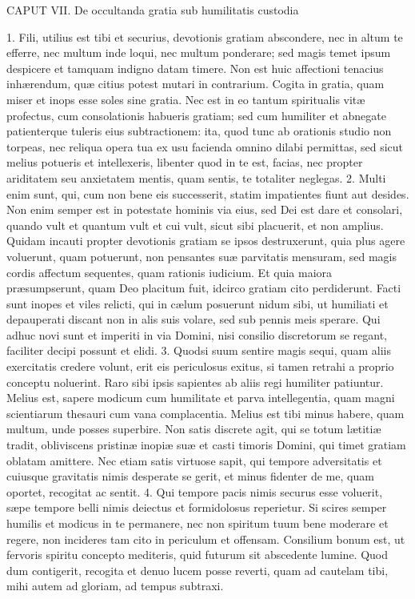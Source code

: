 CAPUT VII.
De occultanda gratia sub humilitatis custodia

1. Fili, utilius est tibi et securius, devotionis gratiam abscondere, nec in altum te efferre, nec multum inde loqui, nec multum ponderare; sed magis temet ipsum despicere et tamquam indigno datam timere. Non est huic affectioni tenacius inhærendum, quæ citius potest mutari in contrarium. Cogita in gratia, quam miser et inops esse soles sine gratia. Nec est in eo tantum spiritualis vitæ profectus, cum consolationis habueris gratiam; sed cum humiliter et abnegate patienterque tuleris eius subtractionem: ita, quod tunc ab orationis studio non torpeas, nec reliqua opera tua ex usu facienda omnino dilabi permittas, sed sicut melius potueris et intellexeris, libenter quod in te est, facias, nec propter ariditatem seu anxietatem mentis, quam sentis, te totaliter neglegas.
2. Multi enim sunt, qui, cum non bene eis successerit, statim impatientes fiunt aut desides. Non enim semper est in potestate hominis via eius, sed Dei est dare et consolari, quando vult et quantum vult et cui vult, sicut sibi placuerit, et non amplius. Quidam incauti propter devotionis gratiam se ipsos destruxerunt, quia plus agere voluerunt, quam potuerunt, non pensantes suæ parvitatis mensuram, sed magis cordis affectum sequentes, quam rationis iudicium. Et quia maiora præsumpserunt, quam Deo placitum fuit, idcirco gratiam cito perdiderunt. Facti sunt inopes et viles relicti, qui in cælum posuerunt nidum sibi, ut humiliati et depauperati discant non in alis suis volare, sed sub pennis meis sperare. Qui adhuc novi sunt et imperiti in via Domini, nisi consilio discretorum se regant, faciliter decipi possunt et elidi.
3. Quodsi suum sentire magis sequi, quam aliis exercitatis credere volunt, erit eis periculosus exitus, si tamen retrahi a proprio conceptu noluerint. Raro sibi ipsis sapientes ab aliis regi humiliter patiuntur. Melius est, sapere modicum cum humilitate et parva intellegentia, quam magni scientiarum thesauri cum vana complacentia. Melius est tibi minus habere, quam multum, unde posses superbire. Non satis discrete agit, qui se totum lætitiæ tradit, obliviscens pristinæ inopiæ suæ et casti timoris Domini, qui timet gratiam oblatam amittere. Nec etiam satis virtuose sapit, qui tempore adversitatis et cuiusque gravitatis nimis desperate se gerit, et minus fidenter de me, quam oportet, recogitat ac sentit.
4. Qui tempore pacis nimis securus esse voluerit, sæpe tempore belli nimis deiectus et formidolosus reperietur. Si scires semper humilis et modicus in te permanere, nec non spiritum tuum bene moderare et regere, non incideres tam cito in periculum et offensam. Consilium bonum est, ut fervoris spiritu concepto mediteris, quid futurum sit abscedente lumine. Quod dum contigerit, recogita et denuo lucem posse reverti, quam ad cautelam tibi, mihi autem ad gloriam, ad tempus subtraxi.
